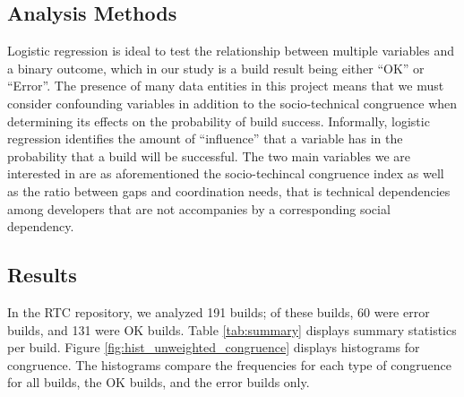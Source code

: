 \subsection{Analysis Methods}
\label{sec:methodology}
Logistic regression is ideal to test the relationship between multiple variables and a binary outcome, which in our study is a build result being either ``OK'' or ``Error''. The presence of many data entities in this project means that we must consider confounding variables in addition to the socio-technical congruence when determining its effects on the probability of build success. Informally, logistic regression identifies the amount of ``influence'' that a variable has in the probability that a build will be successful.
The two main variables we are interested in are as aforementioned the socio-techincal congruence index as well as the ratio between gaps and coordination needs, that is technical dependencies among developers that are not accompanies by a corresponding social dependency.

%

\subsection{Results}
\label{sec:results}
In the RTC repository, we analyzed 191 builds; of these builds, 60 were error builds, and 131 were OK builds. Table \ref{tab:summary} displays summary statistics per build.
Figure \ref{fig:hist_unweighted_congruence} displays histograms for congruence. The histograms compare the frequencies for each type of congruence for all builds, the OK builds, and the error builds only.

